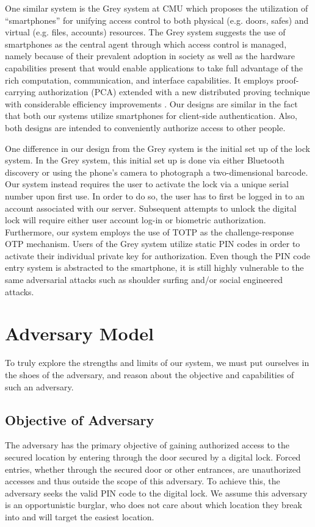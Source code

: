 \documentclass[conference]{IEEEtran}
\begin{document}
	One similar system is the Grey system at CMU which proposes the utilization of “smartphones” for unifying access control to both physical (e.g. doors, safes) and virtual (e.g. files, accounts) resources. The Grey system suggests the use of smartphones as the central agent through which access control is managed, namely because of their prevalent adoption in society as well as the hardware capabilities present that would enable applications to take full advantage of the rich computation, communication, and interface capabilities. It employs proof-carrying authorization (PCA) \cite{ab8} extended with a new distributed proving technique with considerable efficiency improvements \cite{ab9}. Our designs are similar in the fact that both our systems utilize smartphones for client-side authentication. Also, both designs are intended to conveniently authorize access to other people. 
	
	One difference in our design from the Grey system is the initial set up of the lock system. In the Grey system, this initial set up is done via either Bluetooth discovery or using the phone’s camera to photograph a two-dimensional barcode. Our system instead requires the user to activate the lock via a unique serial number upon first use. In order to do so, the user has to first be logged in to an account associated with our server. Subsequent attempts to unlock the digital lock will require either user account log-in or biometric authorization. Furthermore, our system employs the use of TOTP as the challenge-response OTP mechanism. Users of the Grey system utilize static PIN codes in order to activate their individual private key for authorization. Even though the PIN code entry system is abstracted to the smartphone, it is still highly vulnerable to the same adversarial attacks such as shoulder surfing and/or social engineered attacks.

\section{Adversary Model}
To truly explore the strengths and limits of our system, we must put ourselves in the shoes of the adversary, and reason about the objective and capabilities of such an adversary.
\subsection{Objective of Adversary}
The adversary has the primary objective of gaining authorized access to the secured location by entering through the door secured by a digital lock. Forced entries, whether through the secured door or other entrances, are unauthorized accesses and thus outside the scope of this adversary. To achieve this, the adversary seeks the valid PIN code to the digital lock. We assume this adversary is an opportunistic burglar, who does not care about which location they break into and will target the easiest location.
\end{document}
